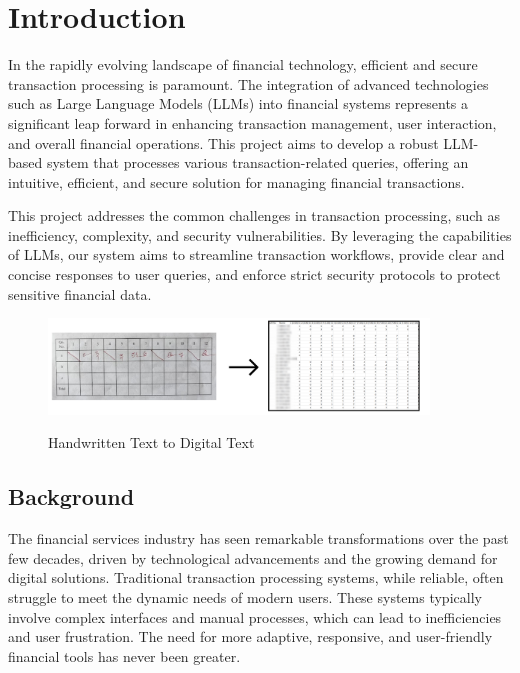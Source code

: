 \setcounter{equation}{0}

\chapter{Introduction}

\noindent In the rapidly evolving landscape of financial technology, efficient and secure transaction processing is paramount. The integration of advanced technologies such as Large Language Models (LLMs) into financial systems represents a significant leap forward in enhancing transaction management, user interaction, and overall financial operations. This project aims to develop a robust LLM-based system that processes various transaction-related queries, offering an intuitive, efficient, and secure solution for managing financial transactions.

\noindent This project addresses the common challenges in transaction processing, such as inefficiency, complexity, and security vulnerabilities. By leveraging the capabilities of LLMs, our system aims to streamline transaction workflows, provide clear and concise responses to user queries, and enforce strict security protocols to protect sensitive financial data.

\begin{figure}[h!]
    \centering
{\includegraphics[width=0.9\textwidth]{Images/Intro/intro_pic.jpg}}
  \caption{Handwritten Text to Digital Text}
\end{figure}

\clearpage

\section{Background}

\noindent The financial services industry has seen remarkable transformations over the past few decades, driven by technological advancements and the growing demand for digital solutions. Traditional transaction processing systems, while reliable, often struggle to meet the dynamic needs of modern users. These systems typically involve complex interfaces and manual processes, which can lead to inefficiencies and user frustration. The need for more adaptive, responsive, and user-friendly financial tools has never been greater.

